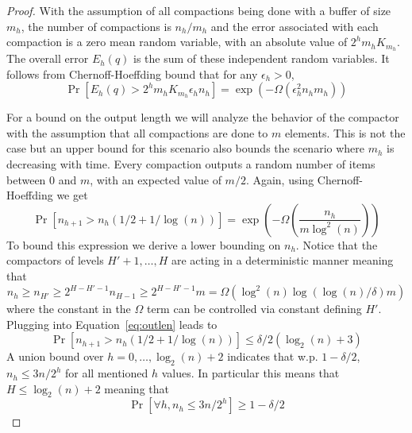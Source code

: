 \documentclass[anon,12pt]{colt2019} %
\newcommand{\eps}{\epsilon}
\renewcommand{\Pr}{\operatorname{Pr}}
\begin{document}
\begin{proof}
With the assumption of all compactions being done with a buffer of size $m_h$, the number of compactions is $n_h/m_h$ and the error associated with each compaction is a zero mean random variable, with an absolute value of $2^h m_h K_{m_h}$. The overall error $E_h(q)$ is the sum of these independent random variables. It follows from Chernoff-Hoeffding bound that for any $\eps_h > 0$,
\begin{equation} \label{eq:err low1}
\Pr\left[ E_h(q) > 2^h m_h K_{m_h} \eps_h n_h \right] = \exp \left( -\Omega\left( \eps_h^2 n_h m_h \right) \right)
\end{equation}

For a bound on the output length we will analyze the behavior of the compactor with the assumption that all compactions are done to $m$ elements. This is not the case but an upper bound for this scenario also bounds the scenario where $m_h$ is decreasing with time. Every compaction outputs a random number of items between $0$ and $m$, with an expected value of $m/2$. Again, using Chernoff-Hoeffding we get
\begin{equation} \label{eq:outlen}
\Pr\left[ n_{h+1} > n_h(1/2+1/\log(n)) \right] = \exp \left( -\Omega\left( \frac{n_h}{m \log^2(n)} \right) \right) 
\end{equation}
To bound this expression we derive a lower bounding on $n_h$. Notice that the compactors of levels $H'+1,\ldots,H$ are acting in a deterministic manner meaning that 
$$n_h \geq n_{H'} \geq 2^{H-H'-1}n_{H-1} \geq 2^{H-H'-1}m = \Omega(\log^2(n)\log(\log(n)/\delta)m)$$
where the constant in the $\Omega$ term can be controlled via constant defining $H'$. Plugging into Equation~\eqref{eq:outlen} leads to
\begin{equation*} 
\Pr\left[ n_{h+1} > n_h(1/2+1/\log(n)) \right] \leq \delta/2(\log_2(n)+3)
\end{equation*}
A union bound over $h=0,\ldots,\log_2(n)+2$ indicates that w.p. $1-\delta/2$, $n_h \leq 3n/2^h$ for all mentioned $h$ values. In particular this means that $H \leq \log_2(n)+2$ meaning that 
\begin{equation} \label{eq:outlen2}
\Pr\left[ \forall h, n_h \leq 3n/2^h \right] \geq 1-\delta/2
\end{equation}


\end{proof}
\end{document}
